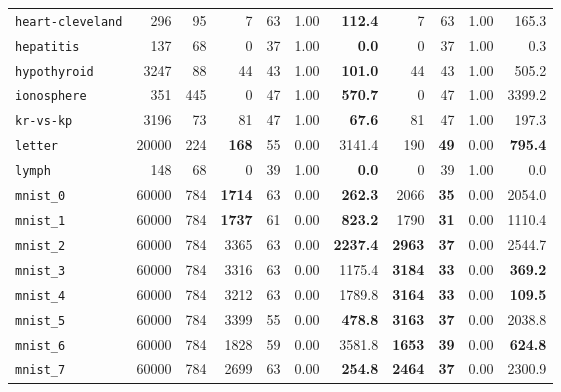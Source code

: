 \begin{tabular}{lccrrrrrrrr}
\texttt{heart-cleveland} & \multicolumn{1}{r}{296} & \multicolumn{1}{r}{95}  & 7 & 63 & 1.00 & \textbf{112.4} & 7 & 63 & 1.00 & 165.3\\
\texttt{hepatitis} & \multicolumn{1}{r}{137} & \multicolumn{1}{r}{68}  & 0 & 37 & 1.00 & \textbf{0.0} & 0 & 37 & 1.00 & 0.3\\
\texttt{hypothyroid} & \multicolumn{1}{r}{3247} & \multicolumn{1}{r}{88}  & 44 & 43 & 1.00 & \textbf{101.0} & 44 & 43 & 1.00 & 505.2\\
\texttt{ionosphere} & \multicolumn{1}{r}{351} & \multicolumn{1}{r}{445}  & 0 & 47 & 1.00 & \textbf{570.7} & 0 & 47 & 1.00 & 3399.2\\
\texttt{kr-vs-kp} & \multicolumn{1}{r}{3196} & \multicolumn{1}{r}{73}  & 81 & 47 & 1.00 & \textbf{67.6} & 81 & 47 & 1.00 & 197.3\\
\texttt{letter} & \multicolumn{1}{r}{20000} & \multicolumn{1}{r}{224}  & \textbf{168} & 55 & 0.00 & 3141.4 & 190 & \textbf{49} & 0.00 & \textbf{795.4}\\
\texttt{lymph} & \multicolumn{1}{r}{148} & \multicolumn{1}{r}{68}  & 0 & 39 & 1.00 & \textbf{0.0} & 0 & 39 & 1.00 & 0.0\\
\texttt{mnist\_0} & \multicolumn{1}{r}{60000} & \multicolumn{1}{r}{784}  & \textbf{1714} & 63 & 0.00 & \textbf{262.3} & 2066 & \textbf{35} & 0.00 & 2054.0\\
\texttt{mnist\_1} & \multicolumn{1}{r}{60000} & \multicolumn{1}{r}{784}  & \textbf{1737} & 61 & 0.00 & \textbf{823.2} & 1790 & \textbf{31} & 0.00 & 1110.4\\
\texttt{mnist\_2} & \multicolumn{1}{r}{60000} & \multicolumn{1}{r}{784}  & 3365 & 63 & 0.00 & \textbf{2237.4} & \textbf{2963} & \textbf{37} & 0.00 & 2544.7\\
\texttt{mnist\_3} & \multicolumn{1}{r}{60000} & \multicolumn{1}{r}{784}  & 3316 & 63 & 0.00 & 1175.4 & \textbf{3184} & \textbf{33} & 0.00 & \textbf{369.2}\\
\texttt{mnist\_4} & \multicolumn{1}{r}{60000} & \multicolumn{1}{r}{784}  & 3212 & 63 & 0.00 & 1789.8 & \textbf{3164} & \textbf{33} & 0.00 & \textbf{109.5}\\
\texttt{mnist\_5} & \multicolumn{1}{r}{60000} & \multicolumn{1}{r}{784}  & 3399 & 55 & 0.00 & \textbf{478.8} & \textbf{3163} & \textbf{37} & 0.00 & 2038.8\\
\texttt{mnist\_6} & \multicolumn{1}{r}{60000} & \multicolumn{1}{r}{784}  & 1828 & 59 & 0.00 & 3581.8 & \textbf{1653} & \textbf{39} & 0.00 & \textbf{624.8}\\
\texttt{mnist\_7} & \multicolumn{1}{r}{60000} & \multicolumn{1}{r}{784}  & 2699 & 63 & 0.00 & \textbf{254.8} & \textbf{2464} & \textbf{37} & 0.00 & 2300.9\\

\end{tabular}
